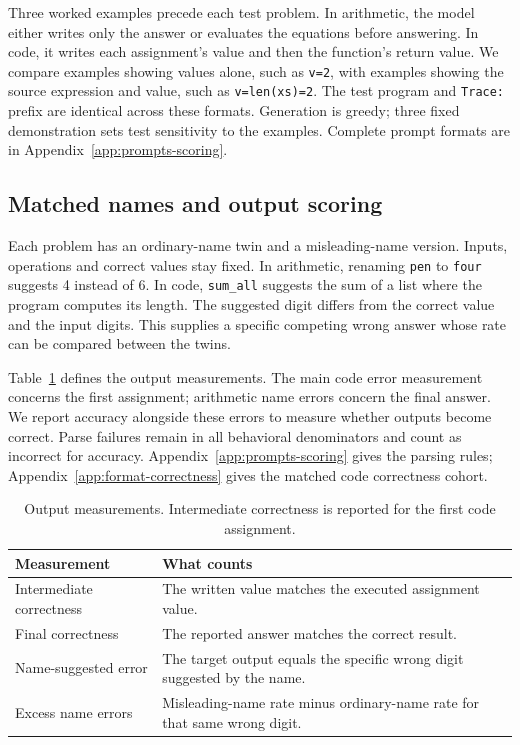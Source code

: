 \documentclass[11pt]{article}
\begin{document}
Three worked examples precede each test problem. In arithmetic, the model either
writes only the answer or evaluates the equations before answering. In code, it
writes each assignment's value and then the function's return value. We compare
examples showing values alone, such as \texttt{v=2}, with examples showing the
source expression and value, such as \texttt{v=len(xs)=2}. The test program and
\texttt{Trace:} prefix are identical across these formats. Generation is greedy;
three fixed demonstration sets test sensitivity to the examples. Complete prompt
formats are in Appendix~\ref{app:prompts-scoring}.

\subsection{Matched names and output scoring}

Each problem has an ordinary-name twin and a misleading-name version. Inputs,
operations and correct values stay fixed. In arithmetic, renaming \texttt{pen}
to \texttt{four} suggests 4 instead of 6. In code, \texttt{sum\_all} suggests the
sum of a list where the program computes its length. The suggested digit differs
from the correct value and the input digits. This supplies a specific competing
wrong answer whose rate can be compared between the twins.

Table~\ref{tab:scoring} defines the output measurements. The main code error
measurement concerns the first assignment; arithmetic name errors concern the
final answer. We report accuracy alongside these errors to measure whether
outputs become correct. Parse failures remain in all behavioral denominators and
count as incorrect for accuracy. Appendix~\ref{app:prompts-scoring} gives the
parsing rules; Appendix~\ref{app:format-correctness} gives the matched code
correctness cohort.

\begin{table}[t]
\centering\small
\begin{tabular}{@{}p{}p{}@{}}
\toprule
Measurement & What counts \\
\midrule
Intermediate correctness & The written value matches the executed assignment value. \\
Final correctness & The reported answer matches the correct result. \\
Name-suggested error & The target output equals the specific wrong digit suggested by the name. \\
Excess name errors & Misleading-name rate minus ordinary-name rate for that same wrong digit. \\
\bottomrule
\end{tabular}
\caption{Output measurements. Intermediate correctness is reported for the first code assignment.}
\label{tab:scoring}
\end{table}
\end{document}
